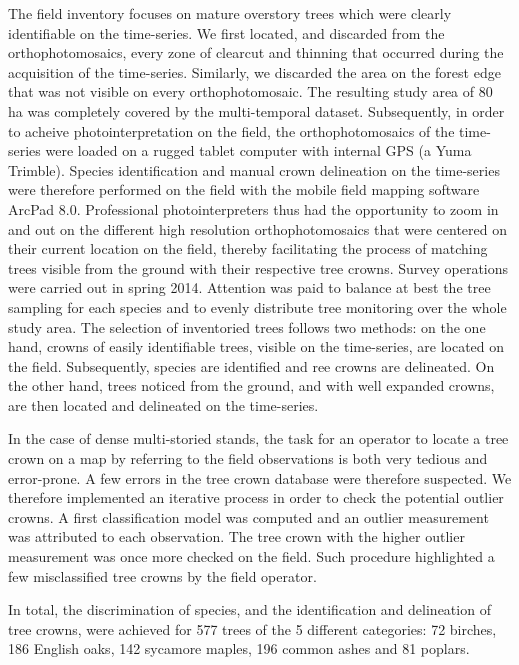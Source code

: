 \documentclass[remotesensing,article,submit,moreauthors,pdftex,12pt,a4paper]{mdpi} %
\begin{document}
The field inventory focuses on mature overstory trees which were clearly identifiable on the time-series. 
We first located, and discarded from the orthophotomosaics, every zone of clearcut and thinning that occurred during the acquisition of the time-series. 
Similarly, we discarded the area on the forest edge that was not visible on every orthophotomosaic. 
The resulting study area of 80 ha was completely covered by the multi-temporal dataset. 
Subsequently, in order to acheive photointerpretation on the field, the orthophotomosaics of the time-series were loaded on a rugged tablet computer with internal GPS (a Yuma Trimble\textsuperscript{\textregistered}). 
Species identification and manual crown delineation on the time-series were therefore performed on the field with the mobile field mapping software ArcPad 8.0. 
Professional photointerpreters thus had the opportunity to zoom in and out on the different high resolution orthophotomosaics that were centered on their current location on the field, thereby facilitating the process of matching trees visible from the ground with their respective tree crowns. 
Survey operations were carried out in spring 2014.
Attention was paid to balance at best the tree sampling for each species and to evenly distribute tree monitoring over the whole study area. 
The selection of inventoried trees follows two methods: on the one hand, crowns of easily identifiable trees, visible on the time-series, are located on the field. Subsequently, species are identified and ree crowns are delineated. 
On the other hand, trees noticed from the ground, and with well expanded crowns, are then located and delineated on the time-series. 

In the case of dense multi-storied stands, the task for an operator to locate a tree crown on a map by referring to the field observations is both very tedious and error-prone. A few errors in the tree crown database were therefore suspected. 
We therefore implemented an iterative process in order to check the potential outlier crowns. 
A first classification model was computed and an outlier measurement was attributed to each observation. 
The tree crown with the higher outlier measurement was once more checked on the field. Such procedure highlighted a few misclassified tree crowns by the field operator.

In total, the discrimination of species, and the identification and delineation of tree crowns, were achieved for 577 trees of the 5 different categories: 72 birches, 186 English oaks, 142 sycamore maples, 196 common ashes and 81 poplars.
\end{document}
